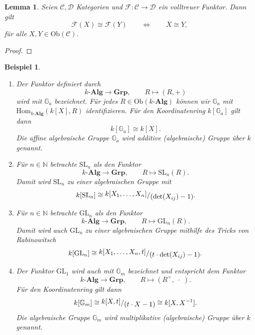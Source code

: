 \documentclass[a4paper, 11pt]{scrartcl}
\newcommand{\N}{\mathbb{N}}
\newcommand{\ringquot}[2]{{\raisebox{.2em}{\(#1\)}/\raisebox{-.2em}{\(#2\)}}}
\newcommand{\Hom}{\text{Hom}}
\newcommand{\Ob}{\text{Ob}}
\theoremstyle{basicstyle}
\newtheorem{beispiel}[definition]{Beispiel}
\newtheorem{lemma}[definition]{Lemma}
\begin{document}
    \begin{lemma}
        Seien \(\mathcal{C}, \mathcal{D}\) Kategorien und \(\mathcal{F}: \mathcal{C} \to \mathcal{D}\) ein volltreuer Funktor.
        Dann gilt
        \[\mathcal{F}(X) \cong \mathcal{F}(Y) \qquad\iff\qquad X \cong Y,\]
        für alle \(X, Y \in \Ob(\mathcal{C})\).
    \end{lemma}
    \begin{proof}
    \end{proof}

    \begin{beispiel}
        \begin{enumerate}
            \item Der Funktor definiert durch
                \[k\textbf{-Alg} \longrightarrow \textbf{Grp}, \qquad R \mapsto (R, +)\]
                wird mit \(\mathbb{G}_a\) bezeichnet.
                Für jedes \(R \in \Ob(k\textbf{-Alg})\) können wir \(\mathbb{G}_a\) mit \(\Hom_{k\textbf{-Alg}}(k[X], R)\) identifizieren.
                Für den Koordinatenring \(k[\mathbb{G}_a]\) gilt dann \[k[\mathbb{G}_a] \cong k[X].\]
                Die affine algebraische Gruppe \(\mathbb{G}_a\) wird \emph{additive (algebraische) Gruppe über \(k\)} genannt.

            \item Für \(n \in \N\) betrachte \(\text{SL}_n\) als den Funktor
                \[k\textbf{-Alg} \longrightarrow \textbf{Grp}, \qquad R \mapsto \text{SL}_n(R).\]
                Damit wird \(\text{SL}_n\) zu einer algebraischen Gruppe mit
                \[k[\text{SL}_n] \cong \ringquot{k[X_1, \ldots, X_n]}{(\det (X_{ij}) - 1)}.\]

            \item Für \(n \in \N\) betrachte \(\text{GL}_n\) als den Funktor
                \[k\textbf{-Alg} \longrightarrow \textbf{Grp}, \qquad R \mapsto \text{GL}_n(R).\]
                Damit wird auch \(\text{GL}_n\) zu einer algebraischen Gruppe mithilfe des Tricks von Rabinowitsch
                \[k[\text{GL}_n] \cong \ringquot{k[X_1, \ldots, X_n, t]}{(t \cdot \det(X_{ij}) - 1)}.\]

            \item Der Funktor \(\text{GL}_1\) wird auch mit \(\mathbb{G}_m\) bezeichnet und entspricht dem Funktor
                \[k\textbf{-Alg} \longrightarrow \textbf{Grp}, \qquad R \mapsto (R^\times, \;\cdot\;).\]
                Für den Koordinatenring gilt dann
                \[k[\mathbb{G}_m] \cong \ringquot{k[X, t]}{(t \cdot X - 1)} \cong k[X, X^{-1}].\]
                Die algebraische Gruppe \(\mathbb{G}_m\) wird \emph{multiplikative (algebraische) Gruppe über \(k\)} genannt.


\end{enumerate}
\end{beispiel}
\end{document}

